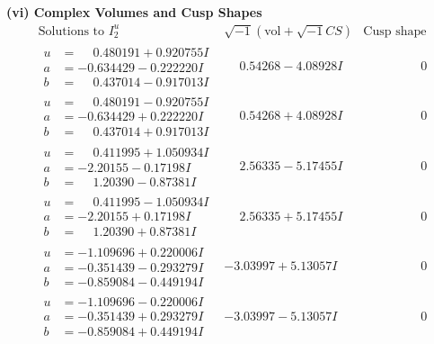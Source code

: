 \documentclass[1p]{elsarticle_modified}
\theoremstyle{definition}
\newcommand{\I}{\sqrt{-1}}
\begin{document}
\newpage\flushleft \textbf{(vi) Complex Volumes and Cusp Shapes}
$$\begin{array}{c|c|c}  
\text{Solutions to }I^u_{2}& \I (\text{vol} + \sqrt{-1}CS) & \text{Cusp shape}\\
 \hline 
\begin{aligned}
u &= \phantom{-}0.480191 + 0.920755 I \\
a &= -0.634429 - 0.222220 I \\
b &= \phantom{-}0.437014 - 0.917013 I\end{aligned}
 & \phantom{-}0.54268 - 4.08928 I & \phantom{-0.000000 } 0 \\ \hline\begin{aligned}
u &= \phantom{-}0.480191 - 0.920755 I \\
a &= -0.634429 + 0.222220 I \\
b &= \phantom{-}0.437014 + 0.917013 I\end{aligned}
 & \phantom{-}0.54268 + 4.08928 I & \phantom{-0.000000 } 0 \\ \hline\begin{aligned}
u &= \phantom{-}0.411995 + 1.050934 I \\
a &= -2.20155 - 0.17198 I \\
b &= \phantom{-}1.20390 - 0.87381 I\end{aligned}
 & \phantom{-}2.56335 - 5.17455 I & \phantom{-0.000000 } 0 \\ \hline\begin{aligned}
u &= \phantom{-}0.411995 - 1.050934 I \\
a &= -2.20155 + 0.17198 I \\
b &= \phantom{-}1.20390 + 0.87381 I\end{aligned}
 & \phantom{-}2.56335 + 5.17455 I & \phantom{-0.000000 } 0 \\ \hline\begin{aligned}
u &= -1.109696 + 0.220006 I \\
a &= -0.351439 - 0.293279 I \\
b &= -0.859084 - 0.449194 I\end{aligned}
 & -3.03997 + 5.13057 I & \phantom{-0.000000 } 0 \\ \hline\begin{aligned}
u &= -1.109696 - 0.220006 I \\
a &= -0.351439 + 0.293279 I \\
b &= -0.859084 + 0.449194 I\end{aligned}
 & -3.03997 - 5.13057 I & \phantom{-0.000000 } 0 \\ \hline\begin{aligned}

\end{aligned}
\end{array}$$
\end{document}
